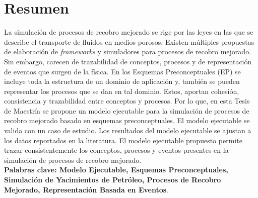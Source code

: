 \newpage{\pagestyle{empty}\cleardoublepage}

\chapter*{Resumen}

La simulación de procesos de recobro mejorado se rige por las leyes en las que se describe el transporte de fluidos en medios porosos. Existen múltiples propuestas de elaboración de \textit{frameworks} y simuladores para procesos de recobro mejorado. Sin embargo, carecen de trazabilidad de conceptos, procesos y de representación de eventos que surgen de la física. En los Esquemas Preconceptuales (EP) se incluye toda la estructura de un dominio de aplicación y, también se pueden representar los procesos que se dan en tal dominio. Estos, aportan cohesión, consistencia y trazabilidad entre conceptos y procesos. Por lo que, en esta Tesis de Maestría se propone un modelo ejecutable para la simulación de procesos de recobro mejorado basado en esquemas preconceptuales. El modelo ejecutable se valida con un caso de estudio. Los resultados del modelo ejecutable se ajustan a los datos reportados en la literatura. El modelo ejecutable propuesto permite trazar consistentemente los conceptos, procesos y eventos presentes en la simulación de procesos de recobro mejorado.\\


\textbf{\small Palabras clave: Modelo Ejecutable, Esquemas Preconceptuales, Simulación de Yacimientos de Petróleo, Procesos de Recobro Mejorado, Representación Basada en Eventos}.\\




